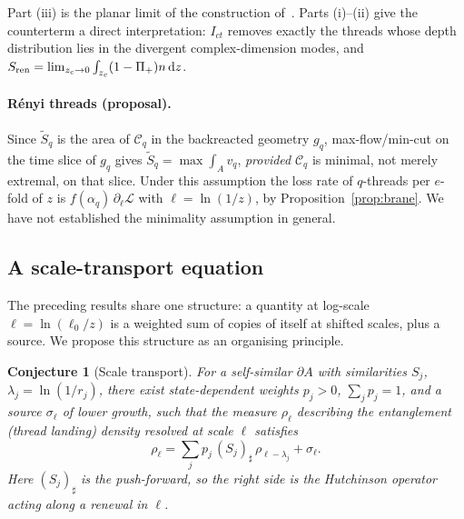 \documentclass[11pt]{article}
\newtheorem{conjecture}{Conjecture}
\theoremstyle{definition}\newtheorem{definition}{Definition}[section]
\theoremstyle{remark}\newtheorem*{remark}{Remark}
\newcommand{\dd}{\mathrm{d}}
\begin{document}
Part (iii) is the planar limit of the construction of~\cite{ABP}. Parts (i)--(ii) give the counterterm a
direct interpretation: $I_{ct}$ removes exactly the threads whose depth distribution lies in the divergent
complex-dimension modes, and $S_{\rm ren}=\lim_{z_c\to0}\int_{z_c}(1-\Pi_+)n\,\dd z$.

\paragraph{R\'enyi threads (proposal).} Since $\tilde S_q$ is the area of $\mathcal C_q$ in the backreacted
geometry $g_q$, max-flow/min-cut on the time slice of $g_q$ gives $\tilde S_q=\max\int_Av_q$, \emph{provided}
$\mathcal C_q$ is minimal, not merely extremal, on that slice. Under this assumption the loss rate of
$q$-threads per $e$-fold of $z$ is $f(\alpha_q)\,\partial_\ell\mathcal L$ with $\ell=\ln(1/z)$, by
Proposition~\ref{prop:brane}. We have not established the minimality assumption in general.

\subsection{A scale-transport equation}
The preceding results share one structure: a quantity at log-scale $\ell=\ln(\ell_0/z)$ is a weighted sum of
copies of itself at shifted scales, plus a source. We propose this structure as an organising principle.

\begin{conjecture}[Scale transport]
\label{conj:transport}
For a self-similar $\partial A$ with similarities $S_j$, $\lambda_j=\ln(1/r_j)$, there exist state-dependent
weights $p_j>0$, $\sum_jp_j=1$, and a source $\sigma_\ell$ of lower growth, such that the measure $\rho_\ell$
describing the entanglement (thread landing) density resolved at scale $\ell$ satisfies
\begin{equation}
\rho_\ell=\sum_jp_j\,(S_j)_\sharp\,\rho_{\ell-\lambda_j}+\sigma_\ell .
\label{eq:transport}
\end{equation}
Here $(S_j)_\sharp$ is the push-forward, so the right side is the Hutchinson operator~\cite{Hutchinson}
acting along a renewal in $\ell$.
\end{conjecture}
\end{document}
